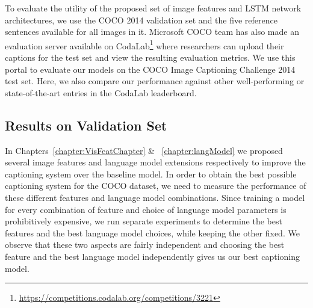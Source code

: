 To evaluate the utility of the proposed set of image features and LSTM network
architectures, we use the COCO 2014 validation set and the five reference
sentences available for all images in it.
Microsoft COCO team has also made an evaluation server available on
CodaLab\footnote{\url{https://competitions.codalab.org/competitions/3221}} where
researchers can upload their captions for the test set and view the resulting
evaluation metrics.
We use this portal to evaluate our models on the COCO Image Captioning Challenge
2014 test set. 
Here, we also compare our performance against other well-performing or
state-of-the-art entries in the CodaLab leaderboard.

\subsection{Results on Validation Set}
In Chapters~\ref{chapter:VisFeatChapter} \& ~\ref{chapter:langModel} we proposed
several image features and language model extensions respectively to improve the
captioning system over the baseline model.
In order to obtain the best possible captioning system for the COCO dataset, we
need to measure the performance of these different features and language model
combinations.
Since training a model for every combination of feature and choice of language
model parameters is prohibitively expensive, we run separate experiments to
determine the best features and the best language model choices, while keeping
the other fixed.
We observe that these two aspects are fairly independent and choosing the best
feature and the best language model independently  gives us our best captioning
model.
